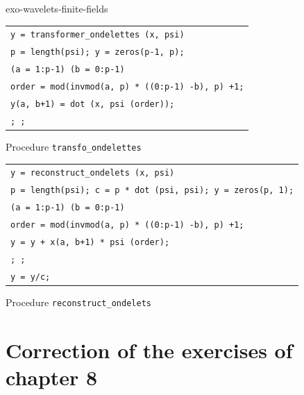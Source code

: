 \begin{correction}{exo-wavelets-finite-fields}
\begin{enumerate}
\begin{listing} \begin{footnotesize}
{\upshape
\begin{tabular}{l} \texttt{\pfunction y = transformer\_ondelettes (x, psi)} \\
\texttt{p = length(psi); y = zeros(p-1, p);} \\
\texttt{\pfor{}(a = 1:p-1) \pfor{}(b = 0:p-1)} \\
\quad \texttt{order = mod(invmod(a, p) * ((0:p-1) -b), p) +1;} \\
\quad \texttt{y(a, b+1) = dot (x, psi (order));} \\
\texttt{\pend{}; \pend{};} \\
\end{tabular}
}
\end{footnotesize}
\caption{Procedure \texttt{\upshape transfo\_ondelettes}}
\label{wavelet-transform-listing-finite-body}
\end{listing}
 
\begin{listing} \begin{footnotesize}
{\upshape
\begin{tabular}{l} \texttt{\pfunction y = reconstruct\_ondelets (x, psi)} \\
\texttt{p = length(psi); c = p * dot (psi, psi); y = zeros(p, 1);} \\
\texttt{\pfor{}(a = 1:p-1) \pfor{}(b = 0:p-1)} \\
\quad \texttt{order = mod(invmod(a, p) * ((0:p-1) -b), p) +1;} \\
\quad \texttt{y = y + x(a, b+1) * psi (order);} \\
\texttt{\pend{}; \pend{};} \\
\texttt{y = y/c;} \\
\end{tabular}
}
\end{footnotesize}
\caption{Procedure \texttt{\upshape reconstruct\_ondelets}}
 \label{listing-transfo-inverse-finite-body}
\end{listing}
\end{enumerate}
\end{correction}

\section{Correction of the exercises of chapter 8}
 
